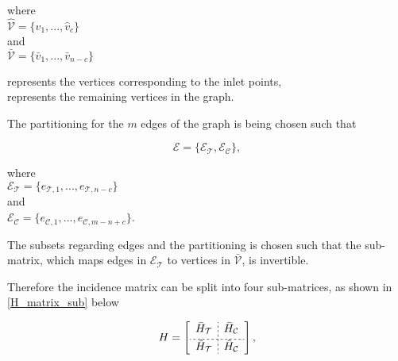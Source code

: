 \begin{minipage}[t]{0.3\textwidth}
where\\
\hspace*{8mm} $\hat{\mathcal{V}} = \{\hat{v}_1, ..., \hat{v}_c\}$\\
and \\
\hspace*{8mm} $\bar{\mathcal{V}} = \{\bar{v}_1, ..., \bar{v}_{n-c}\}$ 
\end{minipage}
\begin{minipage}[t]{0.55\textwidth}
\vspace*{2mm}
 represents the vertices corresponding to the inlet points,\\
 represents the remaining vertices in the graph.
\end{minipage}

The partitioning for the $m$ edges of the graph is being chosen such that

\begin{equation}
  \label{edges1}
  \mathcal{E} = \{\mathcal{E_{\mathcal{T}}}, \mathcal{E_{\mathcal{C}}} \},
\end{equation}

\begin{minipage}[t]{0.35\textwidth}
where\\
\hspace*{8mm} $\mathcal{E_{\mathcal{T}}} = \{e_{\mathcal{T},1}, ..., e_{\mathcal{T},n-c}\}$\\
and\\
\hspace*{8mm} $\mathcal{E_{\mathcal{C}}} = \{e_{\mathcal{C},1}, ..., e_{\mathcal{C},m-n+c}\}$. 
\end{minipage}

The subsets regarding edges and the partitioning is chosen such that the sub-matrix, which maps edges in $\mathcal{E_{\mathcal{T}}}$ to vertices in $\bar{\mathcal{V}}$, is invertible. 

Therefore the incidence matrix can be split into four sub-matrices, as shown in \eqref{H_matrix_sub} below

\begin{equation}
\label{H_matrix_sub}
H=
\left[
\begin{array}{c;{2pt/2pt}r}
\bar{H}_{\mathcal{T}} & \bar{H}_{\mathcal{C}} \\[3pt]
\hdashline[2pt/2pt] 
\hat{H}_{\mathcal{T}} & \hat{H}_{\mathcal{C}}
\end{array}
\right],
\end{equation}

